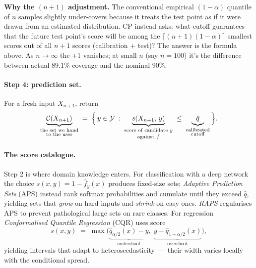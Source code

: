 \documentclass[letterpaper,11pt,leqno]{article}
\begin{document}
\begin{algorithmexplain}
\textbf{Why the $(n+1)$ adjustment.} The conventional empirical $(1-\alpha)$ quantile of $n$ samples slightly under-covers because it treats the test point as if it were drawn from an estimated distribution. CP instead asks: what cutoff guarantees that the future test point's score will be among the $\lceil (n+1)(1-\alpha)\rceil$ smallest scores out of all $n+1$ scores (calibration + test)? The answer is the formula above. As $n \to \infty$ the $+1$ vanishes; at small $n$ (say $n = 100$) it's the difference between actual $89.1\%$ coverage and the nominal $90\%$.
\end{algorithmexplain}

\paragraph{Step 4: prediction set.} For a fresh input $X_{n+1}$, return
\begin{equation*}
\underbrace{\mathcal{C}(X_{n+1})}_{\substack{\text{the set we hand}\\\text{to the user}}}
\;=\;
\Bigl\{\, y \in \mathcal{Y} \;:\;
\underbrace{s(X_{n+1},\, y)}_{\substack{\text{score of candidate } y\\\text{against } \hat{f}}}
\;\leq\;
\underbrace{\hat{q}}_{\substack{\text{calibrated}\\\text{cutoff}}}
\,\Bigr\}.
\end{equation*}

\paragraph{The score catalogue.} Step 2 is where domain knowledge enters. For classification with a deep network the choice $s(x, y) = 1 - \hat{f}_y(x)$ produces fixed-size sets; \emph{Adaptive Prediction Sets} (APS) \cite{sadinle2019aps} instead rank softmax probabilities and cumulate until they exceed $\hat{q}$, yielding sets that \emph{grow} on hard inputs and \emph{shrink} on easy ones. \emph{RAPS} regularises APS to prevent pathological large sets on rare classes. For regression \emph{Conformalised Quantile Regression} (CQR) \cite{romano2019cqr} uses score
\begin{equation*}
s(x, y) \;=\; \max\bigl(\underbrace{\hat{q}_{\alpha/2}(x) - y}_{\text{undershoot}},\; \underbrace{y - \hat{q}_{1-\alpha/2}(x)}_{\text{overshoot}}\bigr),
\end{equation*}
yielding intervals that adapt to heteroscedasticity~--- their width varies locally with the conditional spread.
\end{document}
